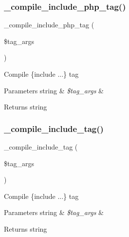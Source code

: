 \subsubsection{\texorpdfstring{\+\_\+compile\+\_\+include\+\_\+php\+\_\+tag()}{\_compile\_include\_php\_tag()}}
{\footnotesize\ttfamily \+\_\+compile\+\_\+include\+\_\+php\+\_\+tag (\begin{DoxyParamCaption}\item[{}]{\$tag\+\_\+args }\end{DoxyParamCaption})}

Compile \{include ...\} tag


\begin{DoxyParams}[1]{Parameters}
string & {\em \$tag\+\_\+args} & \\
\hline
\end{DoxyParams}
\begin{DoxyReturn}{Returns}
string 
\end{DoxyReturn}
\mbox{\label{class_smarty___compiler_ad57897c82c75a0a37868853a544368d5}} 
\subsubsection{\texorpdfstring{\+\_\+compile\+\_\+include\+\_\+tag()}{\_compile\_include\_tag()}}
{\footnotesize\ttfamily \+\_\+compile\+\_\+include\+\_\+tag (\begin{DoxyParamCaption}\item[{}]{\$tag\+\_\+args }\end{DoxyParamCaption})}

Compile \{include ...\} tag


\begin{DoxyParams}[1]{Parameters}
string & {\em \$tag\+\_\+args} & \\
\hline
\end{DoxyParams}
\begin{DoxyReturn}{Returns}
string 
\end{DoxyReturn}
\mbox{\label{class_smarty___compiler_a155076f7f3939480a7cbb17ae1b79d7d}} 
